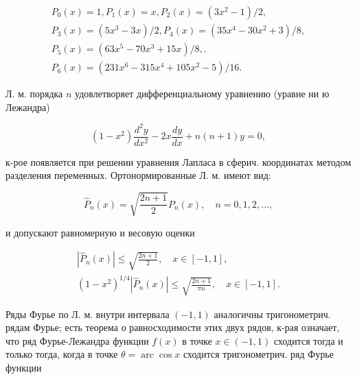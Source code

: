 \documentclass[10pt]{article}
\begin{document}
\[

\begin{gathered}

P_{0}(x)=1, P_{1}(x)=x, P_{2}(x)=\left(3 x^{2}-1\right) / 2, \\

P_{3}(x)=\left(5 x^{3}-3 x\right) / 2, P_{4}(x)=\left(35 x^{4}-30 x^{2}+3\right) / 8, \\

P_{5}(x)=\left(63 x^{5}-70 x^{3}+15 x\right) / 8, . \\

P_{6}(x)=\left(231 x^{6}-315 x^{4}+105 x^{2}-5\right) / 16 .

\end{gathered}

\]



Л. м. порядка $n$ удовлетворяет дифференциальному уравнению (уравне ни ю Лежандра)



\[

\left(1-x^{2}\right) \frac{d^{2} y}{d x^{2}}-2 x \frac{d y}{d x}+n(n+1) y=0,

\]



к-рое появляется при решении уравнения Лапласа в сферич. координатах методом разделения переменных. Ортонормированные Л. м. имеют вид:



\[

\hat{P}_{n}(x)=\sqrt{\frac{2 n+1}{2}} P_{n}(x), \quad n=0,1,2, \ldots,

\]



и допускают равномерную и весовую оценки



\[

\begin{gathered}

\left|\hat{P}_{n}(x)\right| \leqslant \sqrt{\frac{2 n+1}{2}}, \quad x \in[-1,1], \\

\left(1-x^{2}\right)^{1 / 4}\left|\hat{P}_{n}(x)\right| \leqslant \sqrt{\frac{2 n+1}{\pi n}}, \quad x \in[-1,1] .

\end{gathered}

\]



Ряды Фурье по Л. м. внутри интервала $(-1,1)$ аналогичны тригонометрич. рядам Фурье; есть теорема о равносходимости этих двух рядов, к-рая означает, что ряд Фурье-Лежандра функции $f(x)$ в точке $x \in(-1,1)$ сходится тогда и только тогда, когда в точке $\theta=\operatorname{arc} \cos x$ сходится тригонометрич. ряд Фурье функции
\end{document}
